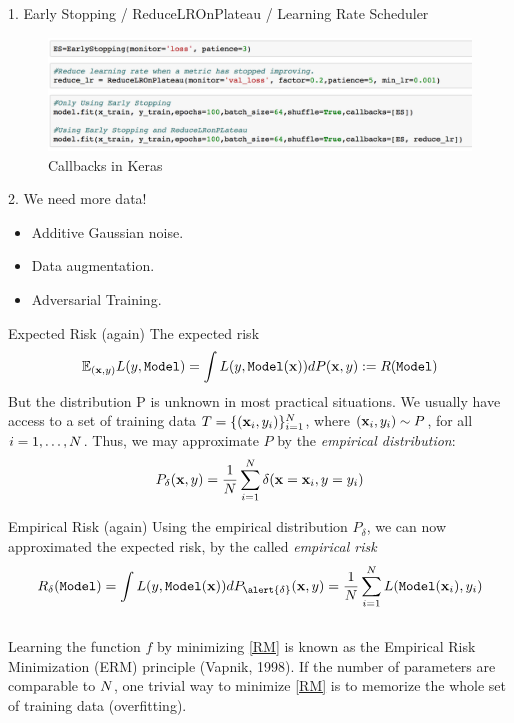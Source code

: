 \documentclass[xcolor=pdftex,dvipsnames,table,mathserif]{beamer}
\begin{document}
\begin{frame}{1. Early Stopping / ReduceLROnPlateau / Learning Rate Scheduler}
\begin{figure}
\includegraphics[width=1 \columnwidth]{../graphics/CallBacksKeras}
\caption{Callbacks in Keras}
\end{figure}
\end{frame}

\begin{frame}{2. We need more data!}
\begin{itemize}
\item Additive Gaussian noise.
\item Data augmentation.
\item Adversarial Training.
\end{itemize}
\end{frame}

\begin{frame}{Expected Risk (again)}
The expected risk
\begin{equation*}
 \mathbb{E}_{(\mathbf{x},y)}  L(y,\texttt{Model}) =  \int L(y,\texttt{Model} (\mathbf{x})) dP(\mathbf{x},y) := R(\texttt{Model} )
\end{equation*}
\pause
But the distribution P is \alert{unknown} in most practical situations. 
\pause
We usually have access to a set of training data $T=\{(\mathbf{x}_i,y_i) \}_{i=1}^{N}$, where $(\mathbf{x}_i,y_i)\sim P$, for all $i=1,\ldots,N$. Thus, we may approximate $P$ by the \emph{empirical distribution}:
\begin{equation*}
P_{\delta}(\mathbf{x},y) = \frac{1}{N}\sum_{i=1}^{N}\delta(\mathbf{x}=\mathbf{x}_i,y=y_i)
\end{equation*}
\end{frame}

\begin{frame}{Empirical Risk (again)}
Using the empirical distribution $P_{\delta}$, we can now approximated the expected risk, by the called \emph{empirical risk}
\begin{equation}\label{RM}
R_{\delta}(\texttt{Model} ) = \int \loss(y,\texttt{Model} (\x)) dP_{\alert{\delta}}(\x,y) = \frac{1}{\nsize}\sum_{i=1}^{\nsize}\loss(\texttt{Model}(\x_i),y_i)
\end{equation} \\
Learning the function $f$ by minimizing \eqref{RM} is known as the Empirical Risk Minimization (ERM) principle \cite{vapnik98} (Vapnik, 1998). If the number of parameters are comparable to $N$, one trivial way to minimize \eqref{RM} is to \alert{memorize} the whole set of training data (overfitting).
\end{frame}
\end{document}
